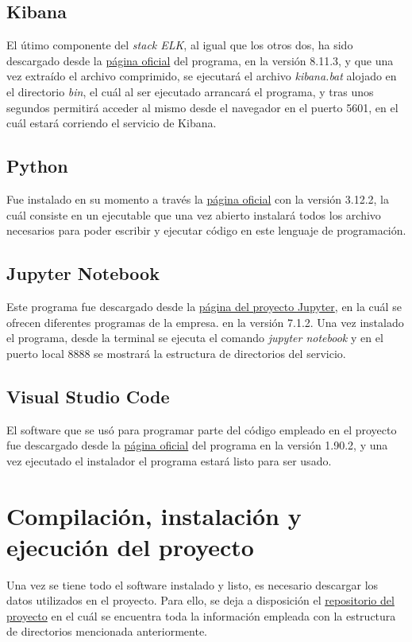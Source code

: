 \subsection{Kibana}
El útimo componente del \textit{stack ELK}, al igual que los otros dos, ha sido descargado desde la \href{https://www.elastic.co/es/kibana}{página oficial} del programa, en la versión 8.11.3, y que una vez extraído el archivo comprimido, se ejecutará el archivo \textit{kibana.bat} alojado en el directorio \textit{bin}, el cuál al ser ejecutado arrancará el programa, y tras unos segundos permitirá acceder al mismo desde el navegador en el puerto 5601, en el cuál estará corriendo el servicio de Kibana. 

\subsection{Python}
Fue instalado en su momento a través la \href{https://www.python.org/}{página oficial} con la versión 3.12.2, la cuál consiste en un ejecutable que una vez abierto instalará todos los archivo necesarios para poder escribir y ejecutar código en este lenguaje de programación.

\subsection{Jupyter Notebook}
Este programa fue descargado desde la \href{https://jupyter.org/}{página del proyecto Jupyter}, en la cuál se ofrecen diferentes programas de la empresa. en la versión 7.1.2. Una vez instalado el programa, desde la terminal se ejecuta el comando \textit{jupyter notebook} y en el puerto local 8888 se mostrará la estructura de directorios del servicio.

\subsection{Visual Studio Code}
El software que se usó para programar parte del código empleado en el proyecto fue descargado desde la \href{https://code.visualstudio.com/}{página oficial} del programa en la versión 1.90.2, y una vez ejecutado el instalador el programa estará listo para ser usado.

\section{Compilación, instalación y ejecución del proyecto}
Una vez se tiene todo el software instalado y listo, es necesario descargar los datos utilizados en el proyecto. Para ello, se deja a disposición el \href{https://github.com/hds1001/Estudio-y-configuracion-de-un-sistema-ELK}{repositorio del proyecto} en el cuál se encuentra toda la información empleada con la estructura de directorios mencionada anteriormente.

